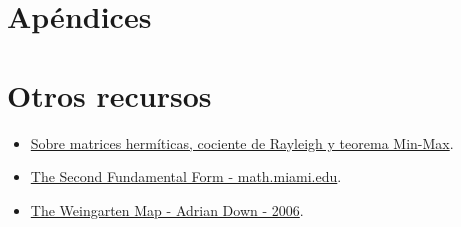 \documentclass[oneside, nochap]{apuntes}
\renewcommand{\(}{\begin{equation}}
\renewcommand{\)}{\end{equation}}
\begin{document}
\appendix
\chapter{Apéndices}

\chapter{Otros recursos}
\begin{itemize}
\item \href{http://math.nyu.edu/~nica/hermitian.pdf}{Sobre matrices hermíticas, cociente de Rayleigh y teorema Min-Max}.
\item \href{http://www.math.miami.edu/~galloway/dgnotes/chpt5.pdf}{The Second Fundamental Form - math.miami.edu}.
\item \href{http://people.duke.edu/~ad159/files/m140/19.pdf}{The Weingarten Map - Adrian Down - 2006}.
\end{itemize}

\printindex
\end{document}
